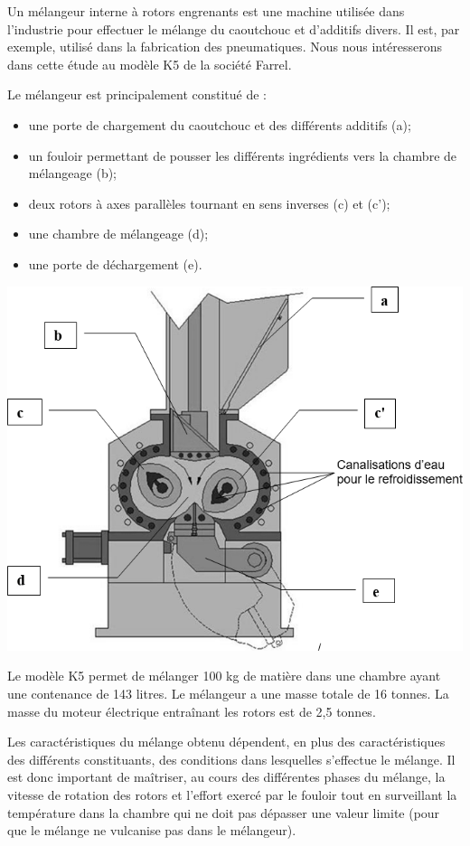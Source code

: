 \documentclass[10pt,fleqn]{article} %
\begin{document}
\begin{minipage}[c]{.65\linewidth}
Un mélangeur interne à rotors engrenants est une machine utilisée dans l'industrie pour effectuer le mélange du caoutchouc et d'additifs divers. Il est, par exemple, utilisé dans la fabrication des pneumatiques.
Nous nous intéresserons dans cette étude au modèle K5 de la société Farrel.

Le mélangeur est principalement constitué de :
\begin{itemize}
\item une porte de chargement du caoutchouc et des différents additifs (a);
\item un fouloir permettant de pousser les différents ingrédients vers la chambre de mélangeage (b);
\item deux rotors à axes parallèles tournant en sens inverses (c) et (c');
\item une chambre de mélangeage (d);
\item une porte de déchargement (e).
\end{itemize}
\end{minipage}

\begin{center}
\includegraphics[width=.7\linewidth]{images/e3a_11}
\end{center}

Le modèle K5 permet de mélanger 100 kg de matière dans une chambre ayant une contenance de 143 litres. Le mélangeur a une masse totale de 16 tonnes. La masse du moteur électrique entraînant les rotors est de 2,5 tonnes.

Les caractéristiques du mélange obtenu dépendent, en plus des caractéristiques des différents constituants, des conditions dans lesquelles s'effectue le mélange. Il est donc important de maîtriser, au cours des différentes phases du mélange, la vitesse de rotation des rotors et l'effort exercé par le fouloir tout en surveillant la température dans la chambre qui ne doit pas dépasser une valeur limite (pour que le mélange ne vulcanise pas dans le mélangeur).
 
\end{document}
